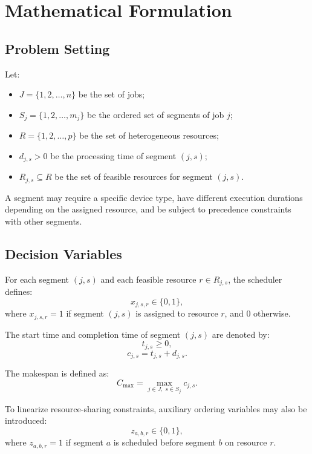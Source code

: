 \documentclass[conference]{IEEEtran}
\begin{document}
\section{Mathematical Formulation}
\subsection{Problem Setting}
Let:
\begin{itemize}
    \item \(J = \{1,2,\ldots,n\}\) be the set of jobs;
    \item \(S_j = \{1,2,\ldots,m_j\}\) be the ordered set of segments of job
    \(j\);
    \item \(R = \{1,2,\ldots,p\}\) be the set of heterogeneous resources;
    \item \(d_{j,s} > 0\) be the processing time of segment \((j,s)\);
    \item \(R_{j,s} \subseteq R\) be the set of feasible resources for segment
    \((j,s)\).
\end{itemize}

A segment may require a specific device type, have different execution
durations depending on the assigned resource, and be subject to precedence
constraints with other segments.

\subsection{Decision Variables}
For each segment \((j,s)\) and each feasible resource \(r \in R_{j,s}\), the
scheduler defines:
\begin{equation}
x_{j,s,r} \in \{0,1\},
\end{equation}
where \(x_{j,s,r}=1\) if segment \((j,s)\) is assigned to resource \(r\), and
\(0\) otherwise.

The start time and completion time of segment \((j,s)\) are denoted by:
\begin{equation}
t_{j,s} \geq 0,
\end{equation}
\begin{equation}
c_{j,s} = t_{j,s} + d_{j,s}.
\end{equation}

The makespan is defined as:
\begin{equation}
C_{\max} = \max_{j \in J,\; s \in S_j} c_{j,s}.
\end{equation}

To linearize resource-sharing constraints, auxiliary ordering variables may also
be introduced:
\begin{equation}
z_{a,b,r} \in \{0,1\},
\end{equation}
where \(z_{a,b,r}=1\) if segment \(a\) is scheduled before segment \(b\) on
resource \(r\).
\end{document}
